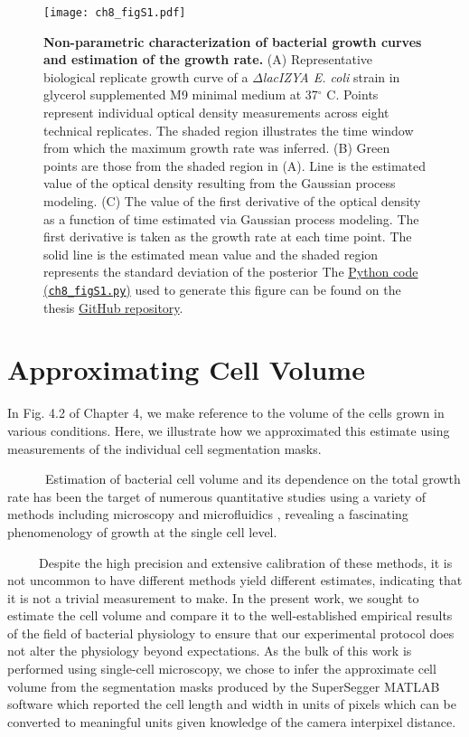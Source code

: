 \documentclass[12pt]{caltech_thesis}
\begin{document}
\hypertarget{fig:gp_growth_curve}{%
\begin{figure}
\centering
\texttt{[image: ch8\_figS1.pdf]}
\caption[{Non-parametric estimation of maximum growth rate from
bacterial growth curves.}]{\textbf{Non-parametric characterization of
bacterial growth curves and estimation of the growth rate.} (A)
Representative biological replicate growth curve of a
\(\Delta\)\emph{lacIZYA E. coli} strain in glycerol supplemented M9
minimal medium at 37\(^\circ\) C. Points represent individual optical
density measurements across eight technical replicates. The shaded
region illustrates the time window from which the maximum growth rate
was inferred. (B) Green points are those from the shaded region in (A).
Line is the estimated value of the optical density resulting from the
Gaussian process modeling. (C) The value of the first derivative of the
optical density as a function of time estimated via Gaussian process
modeling. The first derivative is taken as the growth rate at each time
point. The solid line is the estimated mean value and the shaded region
represents the standard deviation of the posterior The
\href{https://github.com/gchure/phd/blob/master/src/chapter_08/code/ch8_figS1.py}{Python
code (\texttt{ch8\_figS1.py})} used to generate this figure can be found
on the thesis \href{https://github.com/gchure/phd}{GitHub repository}.}
\label{fig:gp_growth_curve}
\end{figure}
}

\hypertarget{approximating-cell-volume}{%
\section{Approximating Cell Volume}\label{approximating-cell-volume}}

In Fig. 4.2 of Chapter 4, we make reference to the volume of the cells
grown in various conditions. Here, we illustrate how we approximated
this estimate using measurements of the individual cell segmentation
masks.

~~~~~~Estimation of bacterial cell volume and its dependence on the
total growth rate has been the target of numerous quantitative studies
using a variety of methods including microscopy
\autocite{pilizota2012,pilizota2014,taheri-araghi2015,schmidt2016,schaechter1958}
and microfluidics \autocite{kubitschek1986}, revealing a fascinating
phenomenology of growth at the single cell level.

~~~~~Despite the high precision and extensive calibration of these
methods, it is not uncommon to have different methods yield different
estimates, indicating that it is not a trivial measurement to make. In
the present work, we sought to estimate the cell volume and compare it
to the well-established empirical results of the field of bacterial
physiology to ensure that our experimental protocol does not alter the
physiology beyond expectations. As the bulk of this work is performed
using single-cell microscopy, we chose to infer the approximate cell
volume from the segmentation masks produced by the SuperSegger MATLAB
software \autocite{stylianidou2016} which reported the cell length and
width in units of pixels which can be converted to meaningful units
given knowledge of the camera interpixel distance.
\end{document}
